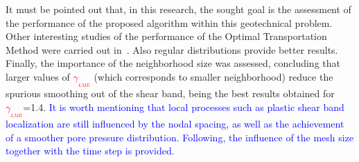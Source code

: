 \documentclass[twocolumn]{svjour3}          %
\begin{document}
It must be pointed out that, in this research, the sought goal is the assessment of the performance of the proposed algorithm within this geotechnical problem. Other interesting studies of the performance of the Optimal Transportation Method were carried out in~\cite{Navas:17b}.  Also regular distributions provide better results. Finally, the importance of the neighborhood size was assessed, concluding that larger values of \textcolor{red}{$\gamma_{_{LME}}$} (which corresponds to smaller neighborhood) reduce the spurious smoothing out of the shear band, being the best results obtained for \textcolor{red}{$\gamma_{_{LME}}$}=1.4. \textcolor{blue}{It is worth mentioning that local processes such as plastic shear band localization are still influenced by the nodal spacing, as well as the achievement of a smoother pore pressure distribution. Following, the influence of the mesh size together with the time step is provided.}
\end{document}
